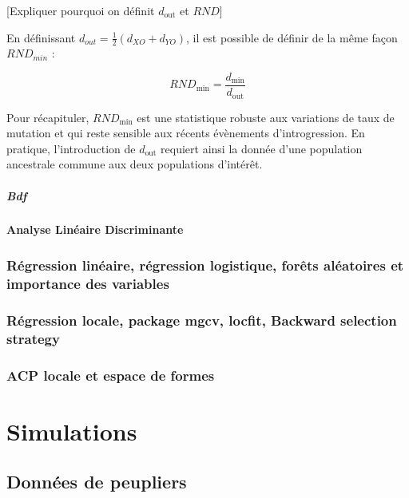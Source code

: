 \documentclass[12pt,twoside]{reedthesis}
\begin{document}
  {[}Expliquer pourquoi on définit \(d_{\text{out}}\) et \(RND\){]}
  
  En définissant \(d_{out} = \frac{1}{2}(d_{XO} + d_{YO})\), il est
  possible de définir de la même façon \(RND_{min}\) :
  
  \[RND_{\text{min}} = \frac{d_{\text{min}}}{d_{\text{out}}}\]
  
  Pour récapituler, \(RND_{\text{min}}\) est une statistique robuste aux
  variations de taux de mutation et qui reste sensible aux récents
  évènements d'introgression. En pratique, l'introduction de
  \(d_{\text{out}}\) requiert ainsi la donnée d'une population ancestrale
  commune aux deux populations d'intérêt.
  
  \subparagraph{Bdf}\label{bdf}
  
  \paragraph{Analyse Linéaire
  Discriminante}\label{analyse-lineaire-discriminante}
  
  \subsubsection{Régression linéaire, régression logistique, forêts
  aléatoires et importance des
  variables}\label{regression-lineaire-regression-logistique-forets-aleatoires-et-importance-des-variables}
  
  \subsubsection{Régression locale, package mgcv, locfit, Backward
  selection
  strategy}\label{regression-locale-package-mgcv-locfit-backward-selection-strategy}
  
  \subsubsection{ACP locale et espace de
  formes}\label{acp-locale-et-espace-de-formes}
  
  \newpage
  
  \section{Simulations}\label{simulations}
  
  \subsection{Données de peupliers}\label{donnees-de-peupliers}
  
\end{document}
